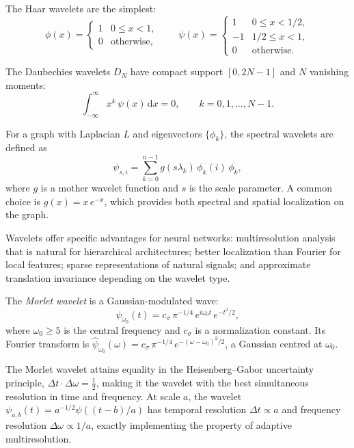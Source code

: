 \begin{example}
\label{ex:grids:haar}
The Haar wavelets are the simplest:
\[
\phi(x) = \begin{cases} 1 & 0 \leq x < 1, \\ 0 & \text{otherwise}, \end{cases}
\qquad
\psi(x) = \begin{cases} 1 & 0 \leq x < 1/2, \\ -1 & 1/2 \leq x < 1, \\ 0 & \text{otherwise}. \end{cases}
\]
\end{example}

\begin{example}
\label{ex:grids:daubechies}
The Daubechies wavelets $D_N$ have compact support $[0, 2N-1]$ and $N$ vanishing
moments:
\[
  \int_{-\infty}^{\infty} x^k\, \psi(x)\, \mathrm{d}x = 0, \qquad k = 0, 1, \ldots, N-1.
\]
\end{example}

\begin{definition}
\label{def:grids:graph-wavelets}
For a graph with Laplacian $L$ and eigenvectors $\{\phi_k\}$, the spectral
wavelets are defined as
\[
  \psi_{s,i} = \sum_{k=0}^{n-1} g(s\lambda_k)\, \phi_k(i)\, \phi_k,
\]
where $g$ is a mother wavelet function and $s$ is the scale parameter. A common
choice is $g(x) = x\, e^{-x}$, which provides both spectral and spatial
localization on the graph.
\end{definition}

Wavelets offer specific advantages for neural networks: multiresolution analysis
that is natural for hierarchical architectures; better localization than Fourier
for local features; sparse representations of natural signals; and approximate
translation invariance depending on the wavelet type.

\begin{definition}
\label{def:grids:morlet}
The \emph{Morlet wavelet} is a Gaussian-modulated wave:
\[
  \psi_{\omega_0}(t) = c_\sigma\, \pi^{-1/4}\, e^{i\omega_0 t}\, e^{-t^2/2},
\]
where $\omega_0 \geq 5$ is the central frequency and $c_\sigma$ is a
normalization constant. Its Fourier transform is
$\hat{\psi}_{\omega_0}(\omega) = c_\sigma\, \pi^{-1/4}\, e^{-(\omega - \omega_0)^2/2}$,
a Gaussian centred at $\omega_0$.
\end{definition}

\begin{remark}
\label{rem:grids:morlet-resolution}
The Morlet wavelet attains equality in the Heisenberg--Gabor uncertainty
principle, $\Delta t \cdot \Delta \omega = \frac{1}{2}$, making it the wavelet
with the best simultaneous resolution in time and frequency. At scale $a$, the
wavelet $\psi_{a,b}(t) = a^{-1/2}\psi((t-b)/a)$ has temporal resolution
$\Delta t \propto a$ and frequency resolution $\Delta \omega \propto 1/a$,
exactly implementing the property of adaptive multiresolution.
\end{remark}

